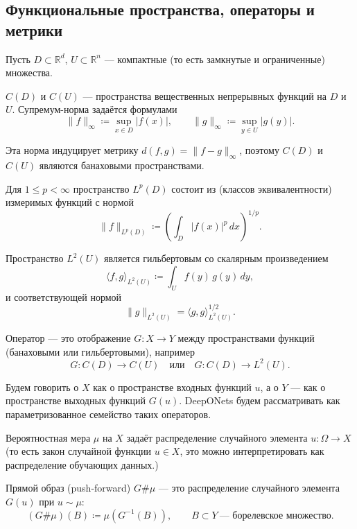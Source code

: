 \documentclass[../NDCNNAI_main.tex]{subfiles}
\begin{document}
\subsection*{Функциональные пространства, операторы и метрики}

Пусть $D \subset \mathbb{R}^d$, $U \subset \mathbb{R}^n$ --- компактные (то есть замкнутые и ограниченные) множества.

\begin{definition}
$C(D)$ и $C(U)$ --- пространства вещественных непрерывных функций на $D$ и $U$.
Супремум-норма задаётся формулами
$$
\|f\|_\infty \coloneq \sup_{x\in D} |f(x)|,\qquad
\|g\|_\infty \coloneq \sup_{y\in U} |g(y)|.
$$
\end{definition}

\begin{remark}
Эта норма индуцирует метрику $d(f,g)=\|f-g\|_\infty$, поэтому $C(D)$ и $C(U)$ являются банаховыми пространствами.
\end{remark}

\begin{definition}
Для $1 \le p < \infty$ пространство $L^p(D)$ состоит из (классов эквивалентности) измеримых функций с нормой
$$
\|f\|_{L^p(D)} \coloneq \left(\int_D |f(x)|^p\,dx\right)^{1/p}.
$$
\end{definition}

\begin{definition}
Пространство $L^2(U)$ является гильбертовым со скалярным произведением
$$
\langle f,g\rangle_{L^2(U)} \coloneq \int_U f(y)\,g(y)\,dy,
$$
и соответствующей нормой
$$
\|g\|_{L^2(U)} = \langle g,g\rangle_{L^2(U)}^{1/2}.
$$
\end{definition}

\begin{definition}
Оператор --- это отображение $G\colon X \to Y$ между пространствами функций (банаховыми или гильбертовыми), например
$$
G\colon C(D) \to C(U)
\quad \text{или} \quad
G\colon C(D) \to L^2(U).
$$
\end{definition}

Будем говорить о $X$ как о пространстве входных функций $u$, а о $Y$ --- как о пространстве выходных функций $G(u)$.
DeepONets будем рассматривать как параметризованное семейство таких операторов.

\begin{definition}
Вероятностная мера $\mu$ на $X$ задаёт распределение случайного элемента
$u\colon\Omega \to X$ (то есть закон случайной функции $u \in X$, это можно интерпретировать как распределение обучающих данных.)
\end{definition}
\begin{definition} Прямой образ (push-forward) $G\#\mu$ --- это распределение случайного элемента $G(u)$ при $u \sim \mu$:
$$
(G\#\mu)(B) \coloneq \mu\!\left(G^{-1}(B)\right),
\qquad B \subset Y \ \text{--- борелевское множество}.
$$
\end{definition}
\end{document}
